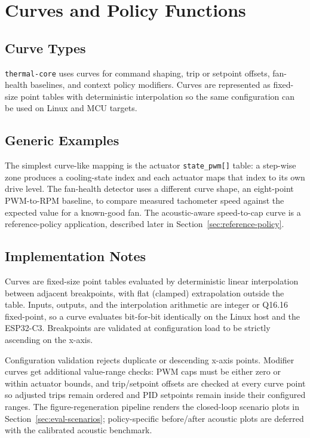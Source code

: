 \section{Curves and Policy Functions}

\subsection{Curve Types}

\texttt{thermal-core} uses curves for command shaping, trip or setpoint offsets, fan-health baselines, and context policy modifiers. Curves are represented as fixed-size point tables with deterministic interpolation so the same configuration can be used on Linux and MCU targets.

\subsection{Generic Examples}

The simplest curve-like mapping is the actuator \texttt{state\_pwm[]} table: a step-wise zone produces a cooling-state index and each actuator maps that index to its own drive level. The fan-health detector uses a different curve shape, an eight-point PWM-to-RPM baseline, to compare measured tachometer speed against the expected value for a known-good fan. The acoustic-aware speed-to-cap curve is a reference-policy application, described later in Section~\ref{sec:reference-policy}.

\subsection{Implementation Notes}

Curves are fixed-size point tables evaluated by deterministic linear interpolation between adjacent breakpoints, with flat (clamped) extrapolation outside the table. Inputs, outputs, and the interpolation arithmetic are integer or Q16.16 fixed-point, so a curve evaluates bit-for-bit identically on the Linux host and the ESP32-C3. Breakpoints are validated at configuration load to be strictly ascending on the x-axis.

Configuration validation rejects duplicate or descending x-axis points. Modifier curves get additional value-range checks: PWM caps must be either zero or within actuator bounds, and trip/setpoint offsets are checked at every curve point so adjusted trips remain ordered and PID setpoints remain inside their configured ranges. The figure-regeneration pipeline renders the closed-loop scenario plots in Section~\ref{sec:eval-scenarios}; policy-specific before/after acoustic plots are deferred with the calibrated acoustic benchmark.

\endinput
